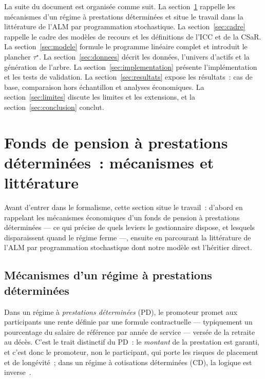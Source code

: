 \documentclass[11pt,letterpaper]{article}
\newcommand{\taustar}{\tau^{\star}}
\theoremstyle{definition}
\begin{document}
La suite du document est organisée comme suit. La section~\ref{sec:contexte}
rappelle les mécanismes d'un régime à prestations déterminées et situe le
travail dans la littérature de l'ALM par programmation stochastique. La
section~\ref{sec:cadre} rappelle
le cadre des modèles de recours et les définitions de l'ICC et de la CSaR. La
section~\ref{sec:modele} formule le programme linéaire complet et introduit le
plancher $\taustar$. La section~\ref{sec:donnees} décrit les données, l'univers
d'actifs et la génération de l'arbre. La section~\ref{sec:implementation} présente
l'implémentation et les tests de validation. La section~\ref{sec:resultats} expose
les résultats~: cas de base, comparaison hors échantillon et analyses économiques.
La section~\ref{sec:limites} discute les limites et les extensions, et la
section~\ref{sec:conclusion} conclut.

\section{Fonds de pension à prestations déterminées~: mécanismes et
littérature}\label{sec:contexte}

Avant d'entrer dans le formalisme, cette section situe le travail~: d'abord en
rappelant les mécanismes économiques d'un fonds de pension à prestations
déterminées --- ce qui précise de quels leviers le gestionnaire dispose, et
lesquels disparaissent quand le régime ferme ---, ensuite en parcourant la
littérature de l'ALM par programmation stochastique dont notre modèle est
l'héritier direct.

\subsection{Mécanismes d'un régime à prestations déterminées}
\label{ssec:mecanismes}

Dans un régime à \emph{prestations déterminées} (PD), le promoteur promet aux
participants une rente définie par une formule contractuelle --- typiquement un
pourcentage du salaire de référence par année de service --- versée de la
retraite au décès. C'est le trait distinctif du PD~: le \emph{montant} de la
prestation est garanti, et c'est donc le promoteur, non le participant, qui
porte les risques de placement et de longévité~; dans un régime à cotisations
déterminées (CD), la logique est inverse~\cite{Broadbent2006}.
\end{document}
